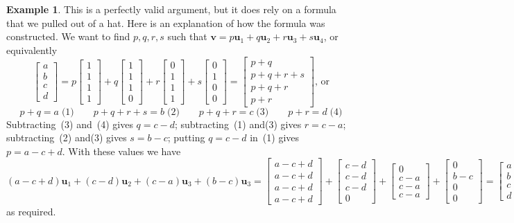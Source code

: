 \documentclass{amsart}
\newcommand{\bsm}       {\left[\begin{smallmatrix}}
\newcommand{\esm}       {\end{smallmatrix}\right]}
\newcommand{\vu}        {\mathbf{u}}
\newcommand{\vv}        {\mathbf{v}}
\renewcommand{\:}       {\colon}
\theoremstyle{definition}
\newtheorem{example}[theorem]{Example}
\begin{document}
\begin{example}
 This is a perfectly valid argument, but it does rely on a
 formula that we pulled out of a hat.  Here is an
 explanation of how the formula was constructed.
 We want to find $p,q,r,s$ such that
  $\vv=p\vu_1+q\vu_2+r\vu_3+s\vu_4$, or equivalently
  {\tiny \[ \bsm a\\ b\\ c\\ d\esm = 
    p \bsm 1\\1\\1\\1\esm + 
    q \bsm 1\\1\\1\\0\esm +
    r \bsm 0\\1\\1\\1\esm +
    s \bsm 0\\1\\0\\0\esm = 
    \bsm p+q \\ p+q+r+s \\ p+q+r \\ p+r \esm
    \text{, or} 
  \]}
  \[ p+q     =a \;\text{(1)}\hspace{2em}
     p+q+r+s =b \;\text{(2)}\hspace{2em}
     p+q+r   =c \;\text{(3)}\hspace{2em}
     p+r     =d \;\text{(4)}
  \]
 Subtracting~(3) and~(4) gives $q=c-d$; 
 subtracting~(1) and(3) gives $r=c-a$;
 subtracting~(2) and(3) gives $s=b-c$;
 putting $q=c-d$ in~(1) gives $p=a-c+d$.
 With these values we have
 {\tiny \[ (a-c+d)\vu_1 + (c-d)\vu_2 + 
    (c-a)\vu_3 + (b-c)\vu_3 = 
    \bsm a-c+d\\ a-c+d\\ a-c+d\\ a-c+d\esm + 
    \bsm c-d\\ c-d\\ c-d\\ 0\esm +
    \bsm 0\\ c-a\\ c-a\\ c-a\esm +
    \bsm 0\\ b-c\\ 0\\ 0 \esm = 
    \bsm a \\ b \\ c \\ d \esm = \vv
 \]}
 as required.
\end{example}
\end{document}
